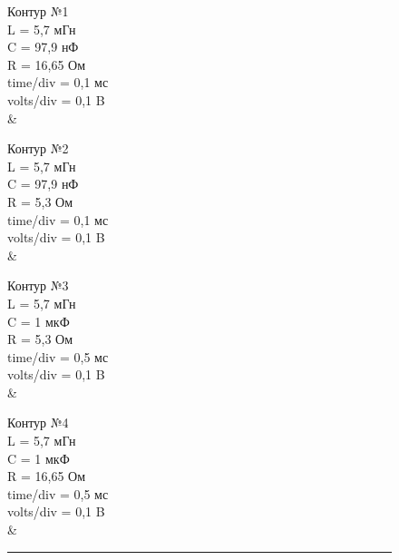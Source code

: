 \documentclass[ a4paper]{article}
\begin{document}
\begin{figure}[htb]
	\begin{minipage}[c][4.3in][t]{0.2\textwidth}
		\centering Контур №1\\
		L = 5,7 мГн\\
		 C = 97,9 нФ\\
		  R = 16,65 Ом\\
		  time/div = 0,1 мс\\
		  volts/div = 0,1 B\\
		  \vspace{0.25cm}
		{  \X & \Y}
	\end{minipage}
	\hfill
	\begin{minipage}[c][4.3in][t]{0.2\textwidth}
				\centering Контур №2\\
		L = 5,7 мГн\\
		C = 97,9 нФ\\
		R = 5,3 Ом\\
		time/div = 0,1 мс\\
		volts/div = 0,1 B\\
		\vspace{0.25cm}
	{  \X & \Y}
	\end{minipage}
\hfill
			\begin{minipage}[c][4.3in][t]{0.2\textwidth}
						\centering Контур №3\\
				L = 5,7 мГн\\
				C = 1 мкФ\\
				R = 5,3 Ом\\
				time/div = 0,5 мс\\
				volts/div = 0,1 B\\
				\vspace{0.25cm}
	{  \X & \Y}
\end{minipage}
\hfill
\begin{minipage}[c][4.3in][t]{0.2\textwidth}
							\centering Контур №4\\
	L = 5,7 мГн\\
	C = 1 мкФ\\
	R = 16,65 Ом\\
	time/div = 0,5 мс\\
	volts/div = 0,1 B\\
	\vspace{0.25cm}
	{  \X & \Y}
\end{minipage}
\rule{164mm}{0.3mm}
\end{figure}
\end{document}
